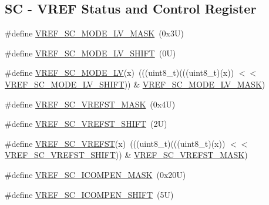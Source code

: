 \subsection*{SC -\/ V\+R\+EF Status and Control Register}
\begin{DoxyCompactItemize}
\item 
\#define \mbox{\hyperlink{group___v_r_e_f___register___masks_ga7eb8ab4b25ed9f93b23d7199c50e7181}{V\+R\+E\+F\+\_\+\+S\+C\+\_\+\+M\+O\+D\+E\+\_\+\+L\+V\+\_\+\+M\+A\+SK}}~(0x3\+U)
\item 
\#define \mbox{\hyperlink{group___v_r_e_f___register___masks_ga3130891ca865a042a784a2c3bc7141b0}{V\+R\+E\+F\+\_\+\+S\+C\+\_\+\+M\+O\+D\+E\+\_\+\+L\+V\+\_\+\+S\+H\+I\+FT}}~(0\+U)
\item 
\#define \mbox{\hyperlink{group___v_r_e_f___register___masks_ga2bd98e877f61a410c3226d6472365b5e}{V\+R\+E\+F\+\_\+\+S\+C\+\_\+\+M\+O\+D\+E\+\_\+\+LV}}(x)~(((uint8\+\_\+t)(((uint8\+\_\+t)(x)) $<$$<$ \mbox{\hyperlink{group___v_r_e_f___register___masks_ga3130891ca865a042a784a2c3bc7141b0}{V\+R\+E\+F\+\_\+\+S\+C\+\_\+\+M\+O\+D\+E\+\_\+\+L\+V\+\_\+\+S\+H\+I\+FT}})) \& \mbox{\hyperlink{group___v_r_e_f___register___masks_ga7eb8ab4b25ed9f93b23d7199c50e7181}{V\+R\+E\+F\+\_\+\+S\+C\+\_\+\+M\+O\+D\+E\+\_\+\+L\+V\+\_\+\+M\+A\+SK}})
\item 
\#define \mbox{\hyperlink{group___v_r_e_f___register___masks_gadc4f84c737775ee82f350149ade8f5bf}{V\+R\+E\+F\+\_\+\+S\+C\+\_\+\+V\+R\+E\+F\+S\+T\+\_\+\+M\+A\+SK}}~(0x4\+U)
\item 
\#define \mbox{\hyperlink{group___v_r_e_f___register___masks_ga88b36251362ceabbeeb2302dae65000d}{V\+R\+E\+F\+\_\+\+S\+C\+\_\+\+V\+R\+E\+F\+S\+T\+\_\+\+S\+H\+I\+FT}}~(2\+U)
\item 
\#define \mbox{\hyperlink{group___v_r_e_f___register___masks_ga30537740fce6d9a373359c63805e11e8}{V\+R\+E\+F\+\_\+\+S\+C\+\_\+\+V\+R\+E\+F\+ST}}(x)~(((uint8\+\_\+t)(((uint8\+\_\+t)(x)) $<$$<$ \mbox{\hyperlink{group___v_r_e_f___register___masks_ga88b36251362ceabbeeb2302dae65000d}{V\+R\+E\+F\+\_\+\+S\+C\+\_\+\+V\+R\+E\+F\+S\+T\+\_\+\+S\+H\+I\+FT}})) \& \mbox{\hyperlink{group___v_r_e_f___register___masks_gadc4f84c737775ee82f350149ade8f5bf}{V\+R\+E\+F\+\_\+\+S\+C\+\_\+\+V\+R\+E\+F\+S\+T\+\_\+\+M\+A\+SK}})
\item 
\#define \mbox{\hyperlink{group___v_r_e_f___register___masks_gaeb737c0b08409b6e7ea8de3bf7a90732}{V\+R\+E\+F\+\_\+\+S\+C\+\_\+\+I\+C\+O\+M\+P\+E\+N\+\_\+\+M\+A\+SK}}~(0x20\+U)
\item 
\#define \mbox{\hyperlink{group___v_r_e_f___register___masks_gab4b6bb1062b8e67c9224814d85df2a2c}{V\+R\+E\+F\+\_\+\+S\+C\+\_\+\+I\+C\+O\+M\+P\+E\+N\+\_\+\+S\+H\+I\+FT}}~(5\+U)

\end{DoxyCompactItemize}
